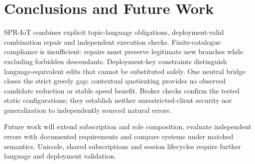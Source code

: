 \documentclass[letterpaper,journal]{IEEEtran}
\begin{document}
\FloatBarrier

\section{Conclusions and Future Work}
SPR-IoT combines explicit topic-language obligations, deployment-valid combination repair and independent execution checks. Finite-catalogue compliance is insufficient: repairs must preserve legitimate new branches while excluding forbidden descendants. Deployment-key constraints distinguish language-equivalent edits that cannot be substituted safely. One neutral bridge closes the strict greedy gap; contextual quotienting provides no observed candidate reduction or stable speed benefit. Broker checks confirm the tested static configurations; they establish neither unrestricted-client security nor generalization to independently sourced natural errors.

Future work will extend subscription and role composition, evaluate independent errors with documented requirements and compare systems under matched semantics. Unicode, shared subscriptions and session lifecycles require further language and deployment validation.



\end{document}

